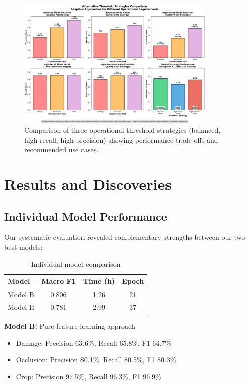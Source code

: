 \documentclass[12pt]{article}
\begin{document}
\begin{figure}[!htb]
\centering
\includegraphics[width=0.85\textwidth]{images/threshold_strategies_comparison.png}
\caption{Comparison of three operational threshold strategies (balanced, high-recall, high-precision) showing performance trade-offs and recommended use cases.}
\end{figure}

\section{Results and Discoveries}

\subsection{Individual Model Performance}

Our systematic evaluation revealed complementary strengths between our two best models:

\begin{table}[!h]
\centering
\begin{tabular}{lccc}
\toprule
\textbf{Model} & \textbf{Macro F1} & \textbf{Time (h)} & \textbf{Epoch} \\
\midrule
Model B & 0.806 & 1.26 & 21 \\
Model H & 0.781 & 2.99 & 37 \\
\bottomrule
\end{tabular}
\caption{Individual model comparison}
\end{table}

\noindent\textbf{Model B:} Pure feature learning approach
\begin{itemize}[itemsep=1pt,parsep=0pt,topsep=2pt]
\item Damage: Precision 63.6\%, Recall 65.8\%, F1 64.7\%
\item Occlusion: Precision 80.1\%, Recall 80.5\%, F1 80.3\%
\item Crop: Precision 97.5\%, Recall 96.3\%, F1 96.9\%
\end{itemize}
\end{document}
